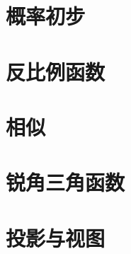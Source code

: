 \documentclass[lang=cn, 10pt, titlestyle=hang]{elegantbook}
\begin{document}
\chapter{概率初步}

\chapter{反比例函数}

\chapter{相似}

\chapter{锐角三角函数}

\chapter{投影与视图}
\end{document}
